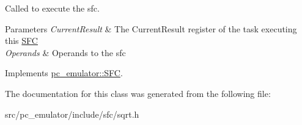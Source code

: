 Called to execute the sfc. 


\begin{DoxyParams}{Parameters}
{\em Current\+Result} & The Current\+Result register of the task executing this \hyperlink{classpc__emulator_1_1SFC}{S\+FC} \\
\hline
{\em Operands} & Operands to the sfc \\
\hline
\end{DoxyParams}


Implements \hyperlink{classpc__emulator_1_1SFC_ab206c80fc0e429c56672b4f6a0ca8635}{pc\+\_\+emulator\+::\+S\+FC}.



The documentation for this class was generated from the following file\+:\begin{DoxyCompactItemize}
\item 
src/pc\+\_\+emulator/include/sfc/sqrt.\+h\end{DoxyCompactItemize}
